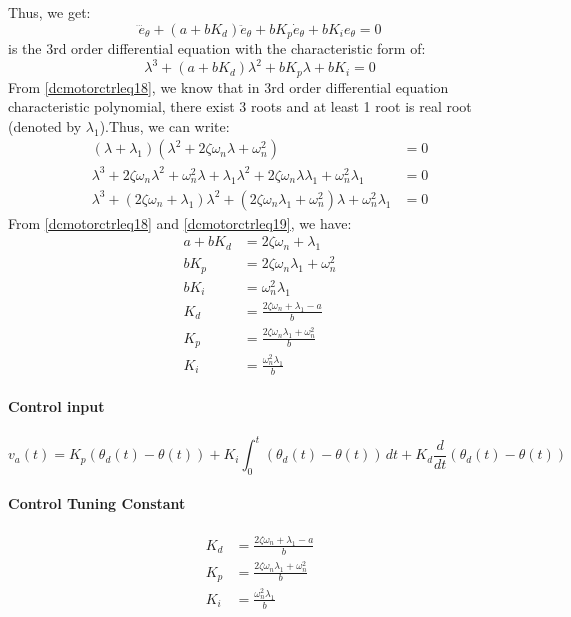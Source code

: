 Thus, we get:
\begin{equation}
	\label{dcmotorctrleq17}
	\dddot{e}_{\theta} +(a+bK_d) \ddot{e}_{\theta} + bK_p\dot{e}_{\theta} + bK_ie_{\theta} = 0
\end{equation}
is the 3rd order differential equation with the characteristic form of:
\begin{equation}
	\label{dcmotorctrleq18}
	\lambda^3 + (a+bK_d)\lambda^2 + bK_p\lambda + bK_i = 0
\end{equation}
From \autoref{dcmotorctrleq18}, we know that in 3rd order differential equation characteristic polynomial, there exist 3 roots and at least 1 root is real root (denoted by $\lambda_1$).Thus, we can write:
\begin{equation}
	\label{dcmotorctrleq19}
	\begin{split}
		(\lambda + \lambda_1)(\lambda^2 + 2\zeta\omega_n\lambda + \omega_n^2) &= 0 \\
		\lambda^3 + 2\zeta\omega_n\lambda^2 + \omega_n^2\lambda + \lambda_1\lambda^2 + 2\zeta\omega_n\lambda\lambda_1 + \omega_n^2\lambda_1 &= 0 \\
		\lambda^3 + (2\zeta\omega_n + \lambda_1)\lambda^2 + (2\zeta\omega_n\lambda_1 + \omega_n^2)\lambda + \omega_n^2\lambda_1 &= 0
	\end{split}
\end{equation}
From \autoref{dcmotorctrleq18} and \autoref{dcmotorctrleq19}, we have:
\[\begin{split}
	a+bK_d &= 2\zeta\omega_n + \lambda_1 \\
	bK_p &= 2\zeta\omega_n\lambda_1 + \omega_n^2 \\
	bK_i &= \omega_n^2\lambda_1 \\
	K_d &= \frac{2\zeta\omega_n + \lambda_1 - a}{b} \\
	K_p &= \frac{2\zeta\omega_n\lambda_1 + \omega_n^2}{b} \\
	K_i &= \frac{\omega_n^2\lambda_1}{b}
\end{split}\]


\begin{tcolorbox}[title=Velocity Control using PID Linear]
	\paragraph{Control input}
	\[v_a(t) = K_p(\theta_d(t) - \theta(t)) + K_i \int_{0}^{t} (\theta_d(t) - \theta(t)) \,dt + K_d \frac{d}{dt} (\theta_d(t) - \theta(t))\]
	\paragraph{Control Tuning Constant}
	\[\begin{split}
		K_d &= \frac{2\zeta\omega_n + \lambda_1 - a}{b} \\
		K_p &= \frac{2\zeta\omega_n\lambda_1 + \omega_n^2}{b} \\
		K_i &= \frac{\omega_n^2\lambda_1}{b}
	\end{split}\]
\end{tcolorbox}
